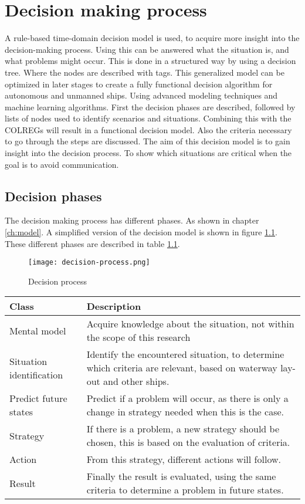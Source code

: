 \chapter{Decision making process}
\label{ch:decision-process}
A rule-based time-domain decision model is used, to acquire more insight into the decision-making process. Using this can be answered what the situation is, and what problems might occur. This is done in a structured way by using a decision tree. Where the nodes are described with tags. This generalized model can be optimized in later stages to create a fully functional decision algorithm for autonomous and unmanned ships. Using advanced modeling techniques and machine learning algorithms. First the decision phases are described, followed by lists of nodes used to identify scenarios and situations. Combining this with the COLREGs will result in a functional decision model. Also the criteria necessary to go through the steps are discussed. The aim of this decision model is to gain insight into the decision process. To show which situations are critical when the goal is to avoid communication.

\section{Decision phases}
The decision making process has different phases. As shown in chapter \ref{ch:model}. A simplified version of the decision model is shown in figure \ref{fig:decision-process}. These different phases are described in table \ref{tab:phases-description}.

\begin{figure}[hb]
	\centering
	\texttt{[image: decision-process.png]}
	\caption{Decision process}
	\label{fig:decision-process}
\end{figure}

\begin{table}[H]
	\begin{tabular}{p{}|p{}}
		\toprule
		Class & Description\\
		\midrule
		Mental model & Acquire knowledge about the situation, not within the scope of this research \\
		Situation identification & Identify the encountered situation, to determine which criteria are relevant, based on waterway lay-out and other ships. \\
		Predict future states & Predict if a problem will occur, as there is only a change in strategy needed when this is the case. \\
		Strategy & If there is a problem, a new strategy should be chosen, this is based on the evaluation of criteria. \\
		Action & From this strategy, different actions will follow. \\
		Result & Finally the result is evaluated, using the same criteria to determine a problem in future states. \\
		\bottomrule
	\end{tabular}
	
	\label{tab:phases-description}
\end{table}

